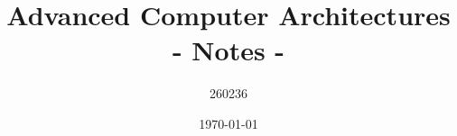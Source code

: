 \author{260236}
\title{Advanced Computer Architectures - Notes - \version}
\date{\printdayoff\today}
\maketitle